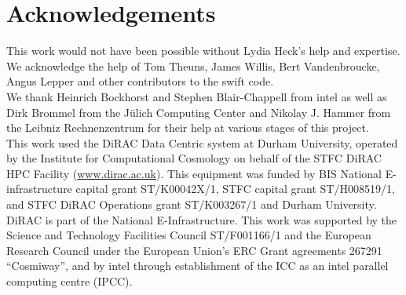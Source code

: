 \documentclass{sig-alternate-05-2015}
\newcommand{\swift}{{\sc swift}\xspace}
\begin{document}

\section{Acknowledgements}
This work would not have been possible without Lydia Heck's help and
expertise. We acknowledge the help of Tom Theuns, James Willis, Bert
Vandenbroucke, Angus Lepper and other contributors to the \swift
code. \\ We thank Heinrich Bockhorst and Stephen Blair-Chappell from {\sc
  intel} as well as Dirk Brommel from the J\"ulich Computing Center
and Nikolay J. Hammer from the Leibniz Rechnenzentrum for their help
at various stages of this project.\\ This work used the DiRAC Data
Centric system at Durham University, operated by the Institute for
Computational Cosmology on behalf of the STFC DiRAC HPC Facility
(\url{www.dirac.ac.uk}). This equipment was funded by BIS National
E-infrastructure capital grant ST/K00042X/1, STFC capital grant
ST/H008519/1, and STFC DiRAC Operations grant ST/K003267/1 and Durham
University. DiRAC is part of the National E-Infrastructure. This work
was supported by the Science and Technology Facilities Council
ST/F001166/1 and the European Research Council under the European
Union's ERC Grant agreements 267291 ``Cosmiway'', and by {\sc intel}
through establishment of the ICC as an {\sc intel} parallel computing
centre (IPCC).

\nocite{*}


\end{document}
